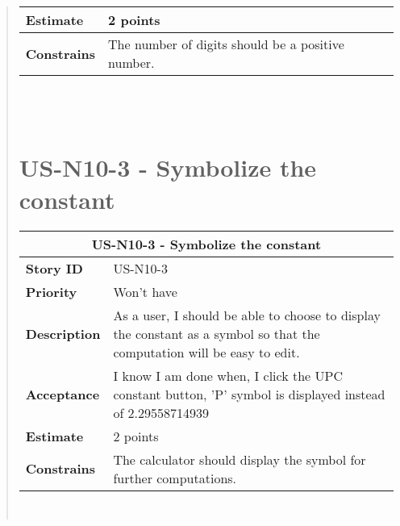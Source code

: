 \documentclass[12pt]{report}
\begin{document}
\begin{quote}
\begin{tabular}{ |p{4cm}|p{10cm}| }
                \\
                 \hline
                 \textbf{Estimate} &  2 points  \\
                 \hline
                 \textbf{Constrains}& The number of digits should be a positive number.   \\
                 \hline
                     \hline
                \end{tabular}
            \hfill\break\\\\
    

       
              \section{US-N10-3 - Symbolize the constant}
                \begin{tabular}{ |p{4cm}|p{10cm}| }
                 \hline
                 \multicolumn{2}{|c|}{\textbf{US-N10-3 - Symbolize the constant} } \\
                 \hline
                 \textbf {Story ID}& US-N10-3  \\
                 \hline
                 \textbf{Priority} & Won't have \\
                 \hline
                 \textbf{Description}   & As a user, I should be able to choose to display the constant as a symbol so that the computation will be easy to edit. \\
                 \hline
                 \textbf{Acceptance}& 
                
                 I know I am done when, I click the UPC constant button, 'P' symbol is displayed instead of 2.29558714939 \\
                 \hline
                 \textbf{Estimate} &  2 points  \\
                 \hline
                 \textbf{Constrains}& The calculator should display the symbol for further computations.  \\
                 \hline
                 \hline
                \end{tabular}
            \hfill\break\\
            

\end{quote}
\end{document}
